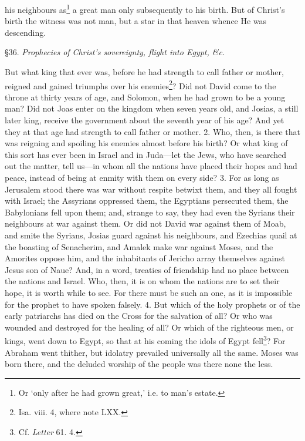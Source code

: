 his neighbours as\footnote{Or ‘only after he had grown great,’ i.e. to man’s estate.} a great man only subsequently to his birth. But of Christ’s birth the witness was not man, but a star in that heaven whence He was descending.


§36. \emph{Prophecies of Christ’s sovereignty, flight into Egypt, \&c.}

But what king that ever was, before he had strength to call father or mother, reigned and gained triumphs over his enemies\footnote{Isa. viii. 4, where note LXX.}? Did not David come to the throne at thirty years of age, and Solomon, when he had grown to be a young man? Did not Joas enter on the kingdom when seven years old, and Josias, a still later king, receive the government about the seventh year of his age? And yet they at that age had strength to call father or mother. 2. Who, then, is there that was reigning and spoiling his enemies almost before his birth? Or what king of this sort has ever been in Israel and in Juda—let the Jews, who have searched out the matter, tell us—in whom all the nations have placed their hopes and had peace, instead of being at enmity with them on every side? 3. For as long as Jerusalem stood there was war without respite betwixt them, and they all fought with Israel; the Assyrians oppressed them, the Egyptians persecuted them, the Babylonians fell upon them; and, strange to say, they had even the Syrians their neighbours at war against them. Or did not David war against them of Moab, and smite the Syrians, Josias guard against his neighbours, and Ezechias quail at the boasting of Senacherim, and Amalek make war against Moses, and the Amorites oppose him, and the inhabitants of Jericho array themselves against Jesus son of Naue? And, in a word, treaties of friendship had no place between the nations and Israel. Who, then, it is on whom the nations are to set their hope, it is worth while to see. For there must be such an one, as it is impossible for the prophet to have spoken falsely. 4. But which of the holy prophets or of the early patriarchs has died on the Cross for the salvation of all? Or who was wounded and destroyed for the healing of all? Or which of the righteous men, or kings, went down to Egypt, so that at his coming the idols of Egypt fell\footnote{Cf. \emph{Letter} 61. 4.}? For Abraham went thither, but idolatry prevailed universally all the same. Moses was born there, and the deluded worship of the people was there none the less.


